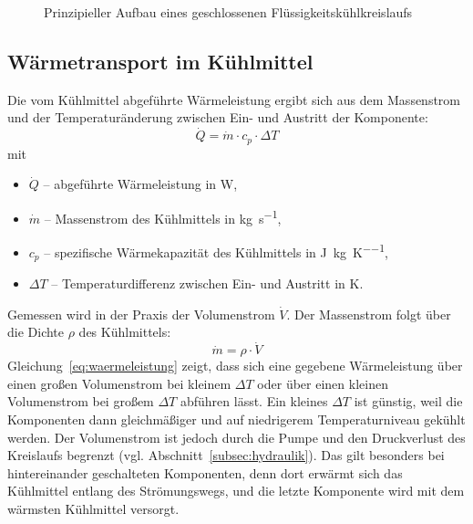 \begin{figure}[htb]
  \centering
  \caption{Prinzipieller Aufbau eines geschlossenen Flüssigkeitskühlkreislaufs}
  \label{fig:kuehlkreislauf_prinzip}
\end{figure}

\subsection{Wärmetransport im Kühlmittel}
\label{subsec:waermetransport}

Die vom Kühlmittel abgeführte Wärmeleistung ergibt sich aus dem Massenstrom
und der Temperaturänderung zwischen Ein- und Austritt der Komponente:
\begin{equation}
  \dot{Q} = \dot{m} \cdot c_p \cdot \Delta T
  \label{eq:waermeleistung}
\end{equation}
mit
\begin{itemize}
  \item $\dot{Q}$ -- abgeführte Wärmeleistung in \si{\watt},
  \item $\dot{m}$ -- Massenstrom des Kühlmittels in \si{\kilo\gram\per\second},
  \item $c_p$ -- spezifische Wärmekapazität des Kühlmittels in
        \si{\joule\per\kilo\gram\per\kelvin},
  \item $\Delta T$ -- Temperaturdifferenz zwischen Ein- und Austritt in \si{\kelvin}.
\end{itemize}

Gemessen wird in der Praxis der Volumenstrom $\dot{V}$. Der Massenstrom folgt
über die Dichte $\rho$ des Kühlmittels:
\begin{equation}
  \dot{m} = \rho \cdot \dot{V}
  \label{eq:massenstrom}
\end{equation}
Gleichung~\eqref{eq:waermeleistung} zeigt, dass sich eine gegebene Wärmeleistung
über einen großen Volumenstrom bei kleinem $\Delta T$ oder über einen kleinen
Volumenstrom bei großem $\Delta T$ abführen lässt. Ein kleines $\Delta T$ ist
günstig, weil die Komponenten dann gleichmäßiger und auf niedrigerem
Temperaturniveau gekühlt werden. Der Volumenstrom ist jedoch durch die Pumpe und
den Druckverlust des Kreislaufs begrenzt (vgl.
Abschnitt~\ref{subsec:hydraulik}). Das gilt besonders bei hintereinander
geschalteten Komponenten, denn dort erwärmt sich das Kühlmittel entlang des
Strömungswegs, und die letzte Komponente wird mit dem wärmsten Kühlmittel
versorgt.

